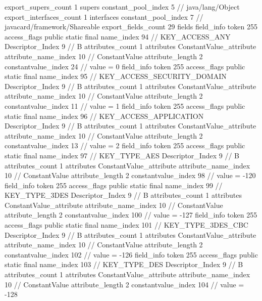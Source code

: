 {{{			export_supers_count	1
			supers {
				constant_pool_index	5		// java/lang/Object
			}
			export_interfaces_count	1
			interfaces {
				constant_pool_index	7		// javacard/framework/Shareable
			}
			export_fields_count	29
			fields {
			field_info {
				token	255
				access_flags	public static final
				name_index	94		// KEY_ACCESS_ANY
				Descriptor_Index	9		// B
				attributes_count	1
				attributes {
				ConstantValue_attribute {
					attribute_name_index	10		// ConstantValue
					attribute_length	2
					constantvalue_index	24		// value = 0
				}
				}
			}
			field_info {
				token	255
				access_flags	public static final
				name_index	95		// KEY_ACCESS_SECURITY_DOMAIN
				Descriptor_Index	9		// B
				attributes_count	1
				attributes {
				ConstantValue_attribute {
					attribute_name_index	10		// ConstantValue
					attribute_length	2
					constantvalue_index	11		// value = 1
				}
				}
			}
			field_info {
				token	255
				access_flags	public static final
				name_index	96		// KEY_ACCESS_APPLICATION
				Descriptor_Index	9		// B
				attributes_count	1
				attributes {
				ConstantValue_attribute {
					attribute_name_index	10		// ConstantValue
					attribute_length	2
					constantvalue_index	13		// value = 2
				}
				}
			}
			field_info {
				token	255
				access_flags	public static final
				name_index	97		// KEY_TYPE_AES
				Descriptor_Index	9		// B
				attributes_count	1
				attributes {
				ConstantValue_attribute {
					attribute_name_index	10		// ConstantValue
					attribute_length	2
					constantvalue_index	98		// value = -120
				}
				}
			}
			field_info {
				token	255
				access_flags	public static final
				name_index	99		// KEY_TYPE_3DES
				Descriptor_Index	9		// B
				attributes_count	1
				attributes {
				ConstantValue_attribute {
					attribute_name_index	10		// ConstantValue
					attribute_length	2
					constantvalue_index	100		// value = -127
				}
				}
			}
			field_info {
				token	255
				access_flags	public static final
				name_index	101		// KEY_TYPE_3DES_CBC
				Descriptor_Index	9		// B
				attributes_count	1
				attributes {
				ConstantValue_attribute {
					attribute_name_index	10		// ConstantValue
					attribute_length	2
					constantvalue_index	102		// value = -126
				}
				}
			}
			field_info {
				token	255
				access_flags	public static final
				name_index	103		// KEY_TYPE_DES
				Descriptor_Index	9		// B
				attributes_count	1
				attributes {
				ConstantValue_attribute {
					attribute_name_index	10		// ConstantValue
					attribute_length	2
					constantvalue_index	104		// value = -128
				}
				}
			}
}}}}
